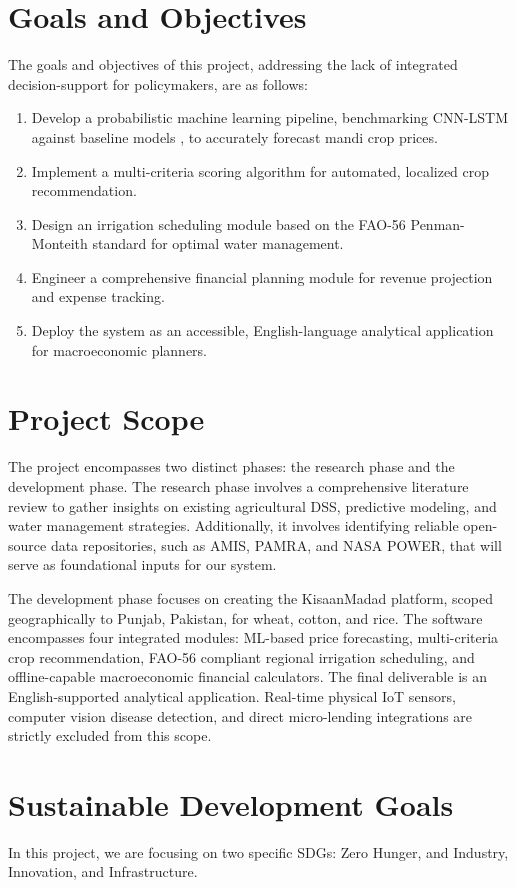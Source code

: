 \documentclass{FastFyp}
\begin{document}
\section{Goals and Objectives}
The goals and objectives of this project, addressing the lack of integrated decision-support for policymakers, are as follows:
\begin{enumerate}
    \item Develop a probabilistic machine learning pipeline, benchmarking CNN-LSTM against baseline models \cite{menculini2021comparing}, to accurately forecast mandi crop prices.
    \item Implement a multi-criteria scoring algorithm for automated, localized crop recommendation.
    \item Design an irrigation scheduling module based on the FAO-56 Penman-Monteith standard for optimal water management.
    \item Engineer a comprehensive financial planning module for revenue projection and expense tracking.
    \item Deploy the system as an accessible, English-language analytical application for macroeconomic planners.
\end{enumerate}

\section{Project Scope}
The project encompasses two distinct phases: the research phase and the development phase. The research phase involves a comprehensive literature review to gather insights on existing agricultural DSS, predictive modeling, and water management strategies. Additionally, it involves identifying reliable open-source data repositories, such as AMIS, PAMRA, and NASA POWER, that will serve as foundational inputs for our system.

The development phase focuses on creating the KisaanMadad platform, scoped geographically to Punjab, Pakistan, for wheat, cotton, and rice. The software encompasses four integrated modules: ML-based price forecasting, multi-criteria crop recommendation, FAO-56 compliant regional irrigation scheduling, and offline-capable macroeconomic financial calculators. The final deliverable is an English-supported analytical application. Real-time physical IoT sensors, computer vision disease detection, and direct micro-lending integrations are strictly excluded from this scope.

\section{Sustainable Development Goals}
In this project, we are focusing on two specific SDGs: Zero Hunger, and Industry, Innovation, and Infrastructure.
\end{document}
